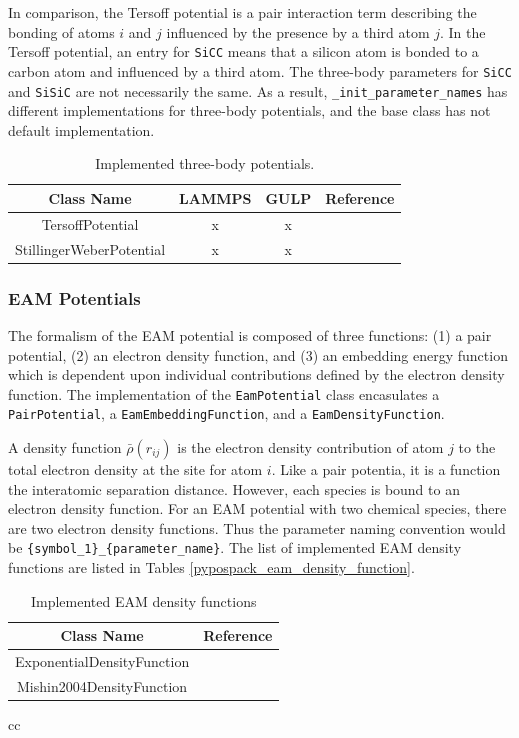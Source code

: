In comparison, the Tersoff potential\cite{tersoff1988_tersoff} is a pair interaction term describing the bonding of atoms $i$ and $j$ influenced by the presence by a third atom $j$.
In the Tersoff potential, an entry for \verb|SiCC| means that a silicon atom is bonded to a carbon atom and influenced by a third atom.  The three-body parameters for \verb|SiCC| and \verb|SiSiC| are not necessarily the same.  As a result, \verb|_init_parameter_names| has different implementations for three-body potentials, and the base class has not default implementation.

\begin{table}[ht]
	\centering
	\caption{Implemented three-body potentials.}
	\label{tbl:pypospack_threebody_potentials}
	\begin{tabular}{cccc}
		\hline
		{Class Name} & LAMMPS & GULP & Reference \\
		\hline
		TersoffPotential & x & x & \cite{tersoff1988_tersoff} \\
		StillingerWeberPotential & x & x &\cite{stillinger1985_sw} \\
		\hline
	\end{tabular}
\end{table}

\subsubsection{EAM Potentials}

The formalism of the EAM potential is composed of three functions: (1) a pair potential, (2) an electron density function, and (3) an embedding energy function which is dependent upon individual contributions defined by the electron density function.
The implementation of the \verb|EamPotential| class encasulates a \verb|PairPotential|, a \verb|EamEmbeddingFunction|, and a \verb|EamDensityFunction|.

  A density function $\bar{\rho}(r_{ij})$ is the electron density contribution of atom $j$ to the total electron density at the site for atom $i$.  Like a pair potentia, it is a function the interatomic separation distance.  However, each species is bound to an electron density function.  For an EAM potential with two chemical species, there are two electron density functions.  Thus the parameter naming convention would be \verb|{symbol_1}_{parameter_name}|.
	The list of implemented EAM density functions are listed in Tables \ref{pypospack_eam_density_function}.

\begin{table}[ht]
	\centering
	\caption{Implemented EAM density functions}
	\begin{tabular}{cc}
		\hline
		{Class Name} & {Reference} \\
		\hline
		ExponentialDensityFunction & \\
		Mishin2004DensityFunction & \cite{mishin2004_eam_NiAl} \\
		\hline
	\end{tabular}{cc}
\end{table}

